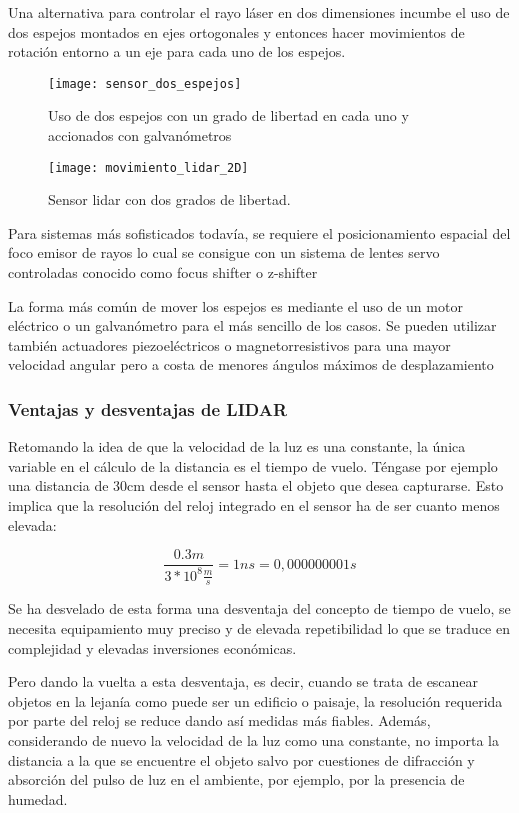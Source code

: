 Una alternativa para controlar el rayo láser en dos dimensiones incumbe el uso de dos espejos montados en ejes ortogonales y entonces hacer movimientos de rotación entorno a un eje para cada uno de los espejos.

\begin{figure}
  \texttt{[image: sensor\_dos\_espejos]}
  \caption{Uso de dos espejos con un grado de libertad en cada uno y accionados con galvanómetros}\label{fig:sensor dos espejos}
\endminipage\hfill
{}
  \texttt{[image: movimiento\_lidar\_2D]}
  \caption{Sensor lidar con dos grados de libertad.}\label{fig:movimiento lidar 2D}
\endminipage\hfill

\end{figure}


Para sistemas más sofisticados todavía, se requiere el posicionamiento espacial del foco emisor de rayos lo cual se consigue con un sistema de lentes servo controladas conocido como focus shifter o z-shifter

La forma más común de mover los espejos es mediante el uso de un motor eléctrico o un galvanómetro para el más sencillo de los casos. Se pueden utilizar también actuadores piezoeléctricos o magnetorresistivos para una mayor velocidad angular pero a costa de menores ángulos máximos de desplazamiento

\subsubsection{Ventajas y desventajas de LIDAR}

Retomando la idea de que la velocidad de la luz es una constante, la única variable en el cálculo de la distancia es el tiempo de vuelo. Téngase por ejemplo una distancia de 30cm desde el sensor hasta el objeto que desea capturarse. Esto implica que la resolución del reloj integrado en el sensor ha de ser cuanto menos elevada:

\begin{equation}
\frac{0.3m}{3*10^{8}\frac{m}{s}} = 1ns =0,000000001s
\end{equation}

Se ha desvelado de esta forma una desventaja del concepto de tiempo de vuelo, se necesita equipamiento muy preciso y de elevada repetibilidad lo que se traduce en complejidad y elevadas inversiones económicas.

Pero dando la vuelta a esta desventaja, es decir, cuando se trata de escanear objetos en la lejanía como puede ser un edificio o paisaje, la resolución requerida por parte del reloj se reduce dando así medidas más fiables. Además, considerando de nuevo la velocidad de la luz como una constante, no importa la distancia a la que se encuentre el objeto salvo por cuestiones de difracción y absorción del pulso de luz en el ambiente, por ejemplo, por la presencia de humedad.

